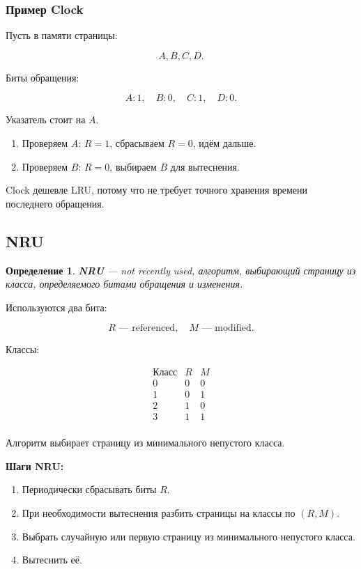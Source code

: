 \documentclass[a4paper,12pt]{article}
\newtheorem{definition}{Определение}
\begin{document}
\subsubsection{Пример Clock}

Пусть в памяти страницы:

\[
A,B,C,D.
\]

Биты обращения:

\[
A:1,\quad B:0,\quad C:1,\quad D:0.
\]

Указатель стоит на $A$.

\begin{enumerate}
    \item Проверяем $A$: $R=1$, сбрасываем $R=0$, идём дальше.
    \item Проверяем $B$: $R=0$, выбираем $B$ для вытеснения.
\end{enumerate}

Clock дешевле LRU, потому что не требует точного хранения времени последнего обращения.

\subsection{NRU}

\begin{definition}
\textbf{NRU} --- not recently used, алгоритм, выбирающий страницу из класса, определяемого битами обращения и изменения.
\end{definition}

Используются два бита:

\[
R \text{ --- referenced},\quad M \text{ --- modified}.
\]

Классы:

\[
\begin{array}{c|c|c}
\text{Класс} & R & M \\
\hline
0 & 0 & 0 \\
1 & 0 & 1 \\
2 & 1 & 0 \\
3 & 1 & 1 \\
\end{array}
\]

Алгоритм выбирает страницу из минимального непустого класса.

\textbf{Шаги NRU:}

\begin{enumerate}
    \item Периодически сбрасывать биты $R$.
    \item При необходимости вытеснения разбить страницы на классы по $(R,M)$.
    \item Выбрать случайную или первую страницу из минимального непустого класса.
    \item Вытеснить её.
\end{enumerate}
\end{document}
